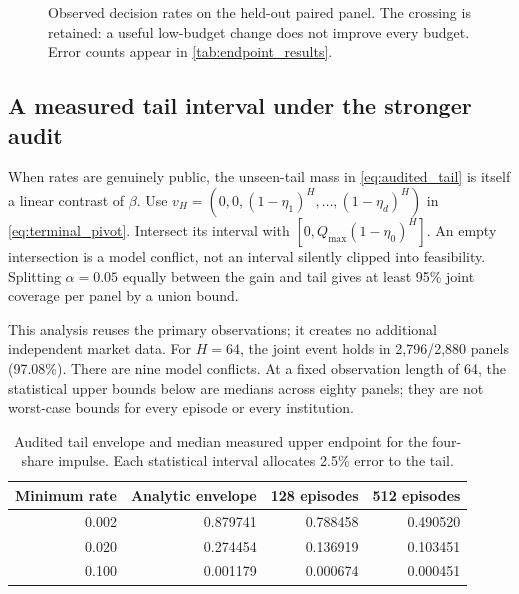 \begin{figure}[htbp]
\centering
{}
\caption{Observed decision rates on the held-out paired panel. The crossing is retained: a useful low-budget change does not improve every budget. Error counts appear in \cref{tab:endpoint_results}.}
\label{fig:endpoint_tradeoff}
\end{figure}

\subsection{A measured tail interval under the stronger audit}
When rates are genuinely public, the unseen-tail mass in \cref{eq:audited_tail} is itself a linear contrast of $\beta$. Use
$v_H=(0,0,(1-\eta_1)^H,\ldots,(1-\eta_d)^H)$ in \cref{eq:terminal_pivot}. Intersect its interval with $[0,Q_{\max}(1-\eta_0)^H]$. An empty intersection is a model conflict, not an interval silently clipped into feasibility. Splitting $\alpha=0.05$ equally between the gain and tail gives at least 95\% joint coverage per panel by a union bound.

This analysis reuses the primary observations; it creates no additional independent market data. For $H=64$, the joint event holds in 2,796/2,880 panels (97.08\%). There are nine model conflicts. At a fixed observation length of 64, the statistical upper bounds below are medians across eighty panels; they are not worst-case bounds for every episode or every institution.
\begin{table}[htbp]
\centering\small
\caption{Audited tail envelope and median measured upper endpoint for the four-share impulse. Each statistical interval allocates 2.5\% error to the tail.}
\begin{tabular}{r r r r}
\toprule
Minimum rate & Analytic envelope & 128 episodes & 512 episodes\\
\midrule
0.002 & 0.879741 & 0.788458 & 0.490520\\
0.020 & 0.274454 & 0.136919 & 0.103451\\
0.100 & 0.001179 & 0.000674 & 0.000451\\
\bottomrule
\end{tabular}
\end{table}

